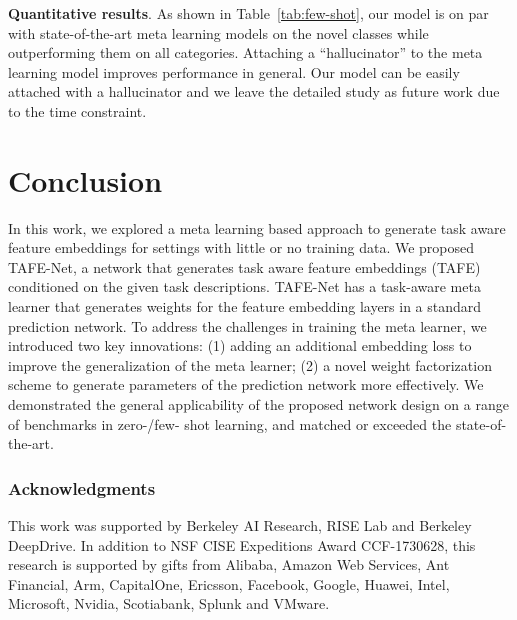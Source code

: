 \documentclass[10pt,twocolumn,letterpaper]{article}
\newcommand{\model}{TAFE-Net\xspace}
\newcommand\minisection[1]{\vspace{2mm}\noindent \textbf{#1}}
\begin{document}
\minisection{Quantitative results}. As shown in Table~\ref{tab:few-shot}, our
model is on par with  state-of-the-art meta learning models on the 
novel classes while outperforming them on all categories. Attaching a ``hallucinator'' to the meta learning model improves performance in
general. Our model can be easily attached with a hallucinator and we leave
the detailed study as future work due to the time constraint. 


 	\section{Conclusion}
In this work, we explored a meta learning based approach to generate task aware feature embeddings for settings with little or no training data.
We proposed TAFE-Net, a network that generates task aware feature embeddings (TAFE) conditioned on the given task descriptions.
\model has a task-aware 
meta learner that generates weights for the feature embedding layers in a standard prediction network.
To address the challenges in training the meta learner, we introduced two key
innovations: (1) adding an additional embedding loss to improve the generalization of the meta learner; (2) a novel weight factorization
scheme to generate parameters of the prediction network more effectively. 
We demonstrated the general applicability of the proposed network design on a range of benchmarks in  zero-/few- shot learning,  and matched or exceeded the state-of-the-art. 
 	
	\vspace{-1em}
	\subsubsection*{Acknowledgments}
	This work was supported by Berkeley AI Research, RISE Lab and Berkeley DeepDrive. In addition to NSF CISE Expeditions Award CCF-1730628, this research is supported by gifts from Alibaba,
	Amazon Web Services, Ant Financial, Arm, CapitalOne,
	Ericsson, Facebook, Google, Huawei, Intel, Microsoft,
	Nvidia, Scotiabank, Splunk and VMware.
	
	{\small
		
		
	}


	
\end{document}
